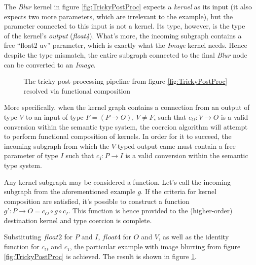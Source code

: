 The \emph{Blur} kernel in figure \ref{fig:TrickyPostProc} expects a \emph{kernel} as its input (it also expects two more parameters, which are irrelevant to the example), but the parameter connected to this input is not a kernel. Its type, however, is the type of the kernel's \emph{output} (\emph{float4}). What's more, the incoming subgraph contains a free ``float2 uv'' parameter, which is exactly what the \emph{Image} kernel needs. Hence despite the type mismatch, the entire subgraph connected to the final \emph{Blur} node can be converted to an \emph{Image}.

\begin{figure}[h!]
  \centering
    \caption[The tricky post-processing pipeline resolved]{The tricky post-processing pipeline from figure \ref{fig:TrickyPostProc} resolved via functional composition}
  \label{fig:TrickyPostProcResolve}
\end{figure}

More specifically, when the kernel graph contains a connection from an output of type $V$ to an input of type $F = (P \rightarrow O)$, $V \neq F$, such that $c_O : V \rightarrow O$ is a valid conversion within the semantic type system, the coercion algorithm will attempt to perform functional composition of kernels. In order for it to succeed, the incoming subgraph from which the $V$-typed output came must contain a free parameter of type $I$ such that $c_I : P \rightarrow I$ is a valid conversion within the semantic type system.

Any kernel subgraph may be considered a function. Let's call the incoming subgraph from the aforementioned example $g$. If the criteria for kernel composition are satisfied, it's possible to construct a function $g\prime : P \rightarrow O = c_O \circ g \circ c_I$. This function is hence provided to the (higher-order) destination kernel and type coercion is complete.

Substituting $float2$ for $P$ and $I$, $float4$ for $O$ and $V$, as well as the identity function for $c_O$ and $c_I$, the particular example with image blurring from figure \ref{fig:TrickyPostProc} is achieved. The result is shown in figure \ref{fig:TrickyPostProcResolve}.

